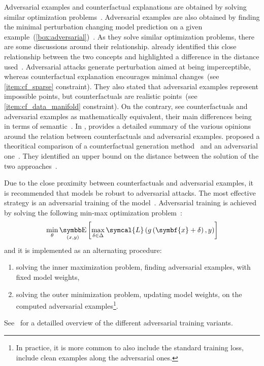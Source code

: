 \documentclass[../main.tex]{subfiles}
\begin{document}
	Adversarial examples and counterfactual explanations are obtained by solving similar optimization problems~\cite{Pawelczyk2021ExploringCE,Freiesleben2021}.
	Adversarial examples are also obtained by finding the minimal perturbation changing model prediction on a given example~(\cref{box:adversarial})~\cite{Szegedy2013IntriguingPO}.
	As they solve similar optimization problems, there are some discussions around their relationship.
	\citeauthor{wachter2017counterfactual} already identified this close relationship between the two concepts and highlighted a difference in the distance used~\cite{wachter2017counterfactual}.
	Adversarial attacks generate perturbation aimed at being imperceptible, whereas counterfactual explanation encourages minimal changes~(see \ref{item:cf_sparse} constraint).
	They also stated that adversarial examples represent impossible points, but counterfactuals are realistic points~(see \ref{item:cf_data_manifold} constraint).
	On the contrary, \citeauthor{browne2020} see counterfactuals and adversarial examples as mathematically equivalent, their main differences being in terms of semantic~\cite{browne2020}.
	In \cite[][8]{Freiesleben2021}, \citeauthor{Freiesleben2021} provides a detailed summary of the various opinions around the relation between counterfactuals and adversarial examples.
	\citeauthor{Pawelczyk2021ExploringCE} proposed a theoritical comparison of a counterfactual generation method~\cite{wachter2017counterfactual} and an adversarial one~\cite{Carlini2016TowardsET}.
	They identified an upper bound on the distance between the solution of the two approaches~\cite{Pawelczyk2021ExploringCE}.

	Due to the close proximity between counterfactuals and adversarial examples, it is recommended that models be robust to adversarial attacks.
	The most effective strategy is an adversarial training of the model~\cite{huang2016learningstrongadversary}.
	Adversarial training is achieved by solving the following min-max optimization problem~\cite{AdvTrainingMinMax}:
	\begin{equation}
		\min_{\theta} \E_{(x,y)}\left[\max_{\delta \in \Delta} \symcal{L}\left(g\left(\symbf{x}+\delta\right), y \right)  \right]
	\end{equation}
	and it is implemented as an alternating procedure:
	\begin{enumerate}
		\item solving the inner maximization problem, \ie{}finding adversarial examples, with fixed model weights,
		\item solving the outer minimization problem, \ie{}updating model weights, on the computed adversarial examples\footnote{In practice, it is more common to also include the standard training loss, \ie{}include clean examples along the adversarial ones.}.
	\end{enumerate}
	See~\cite{AdvTrainSurvey} for a detailled overview of the different adversarial training variants.
\end{document}
